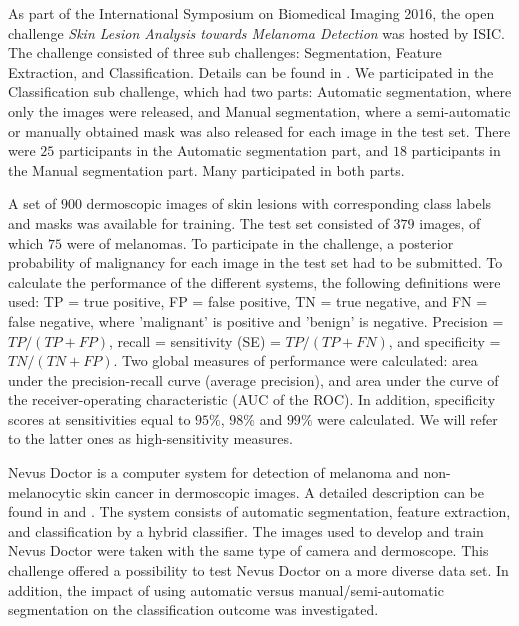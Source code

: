 \documentclass[a4paper,12pt]{article}
\begin{document}
As part of the International Symposium on Biomedical Imaging 2016, the open challenge {\it Skin Lesion Analysis towards Melanoma Detection} was hosted by ISIC. The challenge consisted of three sub challenges: Segmentation, Feature Extraction, and Classification. Details can be found in \cite{Gutman2016Skin}. We participated in the Classification sub challenge, which had two parts: Automatic segmentation, where only the images were released, and Manual segmentation, where a semi-automatic or manually obtained mask was also released for each image in the test set. There were $25$ participants in the Automatic segmentation part, and $18$ participants in the Manual segmentation part. Many participated in both parts. 

A set of $900$ dermoscopic images of skin lesions with corresponding class labels and masks was available for training. The test set consisted of $379$ images, of which $75$ were of melanomas. To participate in the challenge, a posterior probability of malignancy for each image in the test set had to be submitted. To calculate the performance of the different systems, the following definitions were used: TP = true positive, FP = false positive, TN = true negative, and FN = false negative, where 'malignant' is positive and 'benign' is negative. Precision = $TP/(TP+FP)$, recall = sensitivity (SE) = $TP/(TP+FN)$, and specificity = $TN/(TN+FP)$. Two global measures of performance were calculated: area under the precision-recall curve (average precision), and area under the curve of the receiver-operating characteristic (AUC of the ROC). In addition, specificity scores at sensitivities equal to $95\%$, $98\%$ and $99\%$ were calculated. We will refer to the latter ones as high-sensitivity measures. 

Nevus Doctor is a computer system for detection of melanoma and non-melanocytic skin cancer in dermoscopic images. A detailed description can be found in \cite{Mollersen2015Improved} and \cite{Zortea2014Performance}. The system consists of automatic segmentation, feature extraction, and classification by a hybrid classifier. The images used to develop and train Nevus Doctor were taken with the same type of camera and dermoscope. This challenge offered a possibility to test Nevus Doctor on a more diverse data set. In addition, the impact of using automatic versus manual/semi-automatic segmentation on the classification outcome was investigated. 
\end{document}
